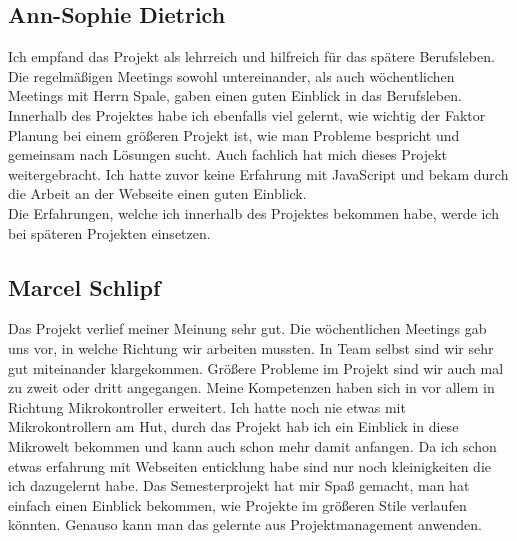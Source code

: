 \subsection*{Ann-Sophie Dietrich}
Ich empfand das Projekt als lehrreich und hilfreich für das spätere Berufsleben.\\
Die regelmäßigen Meetings sowohl untereinander, als auch 
wöchentlichen Meetings mit Herrn Spale, gaben einen guten Einblick in das Berufsleben.\\
Innerhalb des Projektes habe ich ebenfalls viel gelernt, wie wichtig der Faktor Planung 
bei einem größeren Projekt ist, wie man Probleme bespricht und gemeinsam nach Lösungen sucht.
Auch fachlich hat mich dieses Projekt weitergebracht. Ich hatte zuvor keine Erfahrung 
mit JavaScript und bekam durch die Arbeit an der Webseite einen guten Einblick.\\
Die Erfahrungen, welche ich innerhalb des Projektes bekommen habe, werde ich bei 
späteren Projekten einsetzen.

\subsection*{Marcel Schlipf}
Das Projekt verlief meiner Meinung sehr gut. Die wöchentlichen Meetings gab uns
vor, in welche Richtung wir arbeiten mussten. In Team selbst sind wir sehr gut
miteinander klargekommen. Größere Probleme im Projekt sind wir auch mal zu zweit
oder dritt angegangen. \newline
Meine Kompetenzen haben sich in vor allem in Richtung Mikrokontroller erweitert.
Ich hatte noch nie etwas mit Mikrokontrollern am Hut, durch das Projekt hab ich
ein Einblick in diese Mikrowelt bekommen und kann auch schon mehr damit
anfangen.\newline
Da ich schon etwas erfahrung mit Webseiten enticklung habe sind nur noch
kleinigkeiten die ich dazugelernt habe.\newline
Das Semesterprojekt hat mir Spaß gemacht, man hat einfach einen Einblick
bekommen, wie Projekte im größeren Stile verlaufen könnten. Genauso kann man das
gelernte aus Projektmanagement anwenden.
